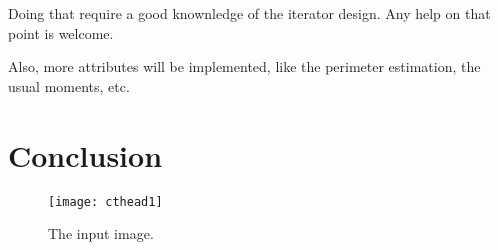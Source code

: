 \documentclass{InsightArticle}
\begin{document}
Doing that require a good knownledge of the iterator design. Any help on that point is
welcome.

Also, more attributes will be implemented, like the perimeter estimation, the usual moments, etc.

\section{Conclusion}







\begin{figure}[htbp]
\centering
\texttt{[image: cthead1]}
\caption{The input image.\label{cthead1}}
\end{figure}


\appendix





\nocite{ITKSoftwareGuide}
\end{document}
